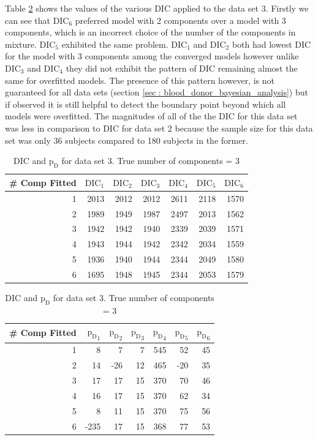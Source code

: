 Table \ref{table : ds_3wellsep_3ppg_dic} shows the values of the various DIC applied to the data set 3. Firstly we can see that $\text{DIC}_6$ preferred model with 2 components over a model with 3 components, which is an incorrect choice of the number of the components in mixture. $\text{DIC}_5$ exhibited the same problem. $\text{DIC}_1$ and $\text{DIC}_2$ both had lowest DIC for the model with 3 components among the converged models however unlike $\text{DIC}_3$ and $\text{DIC}_4$ they did not exhibit the pattern of DIC remaining almost the same for overfitted models. The presence of this pattern however, is not guaranteed for all data sets (section \ref{sec : blood_donor_bayesian_analysis}) but if observed it is still helpful to detect the boundary point beyond which all models were overfitted. The magnitudes of all of the the DIC for this data set was less in comparison to DIC for data set 2 because the sample size for this data set was only 36 subjects compared to 180 subjects in the former.\\

\begin{table}[!htb]
\centering
\captionsetup{justification=centering}
\caption{DIC and $\text{p}_\text{D}$ for data set 3. True number of components = 3}
\label{table : ds_3wellsep_3ppg_dic}
\begin{tabular}{@{}rrrrrrr@{}}
\toprule
\# Comp Fitted & $\text{DIC}_1$ & $\text{DIC}_2$  & $\text{DIC}_3$  & $\text{DIC}_4$  & $\text{DIC}_5$  & $\text{DIC}_6$  \\ \midrule
1 & 2013 & 2012 & 2012 & 2611 & 2118 & 1570 \\
2 & 1989 & 1949 & 1987 & 2497 & 2013 & 1562 \\
3 & 1942 & 1942 & 1940 & 2339 & 2039 & 1571 \\
4 & 1943 & 1944 & 1942 & 2342 & 2034 & 1559 \\
5 & 1936 & 1940 & 1944 & 2344 & 2049 & 1580 \\
6 & 1695 & 1948 & 1945 & 2344 & 2053 & 1579 \\ \bottomrule
\end{tabular}

\begin{tabular}{@{}rrrrrrr@{}}
\toprule
\# Comp Fitted & ${\text{p}_\text{D}}_1$ & ${\text{p}_\text{D}}_2$ & ${\text{p}_\text{D}}_3$ & ${\text{p}_\text{D}}_4$ & ${\text{p}_\text{D}}_5$ & ${\text{p}_\text{D}}_6$ \\ \midrule
1 & 8 & 7 & 7 & 545 & 52 & 45 \\
2 & 14 & -26 & 12 & 465 & -20 & 35 \\
3 & 17 & 17 & 15 & 370 & 70 & 46 \\
4 & 16 & 17 & 15 & 370 & 62 & 34 \\
5 & 8 & 11 & 15 & 370 & 75 & 56 \\
6 & -235 & 17 & 15 & 368 & 77 & 53 \\ \bottomrule
\end{tabular}
\end{table}


